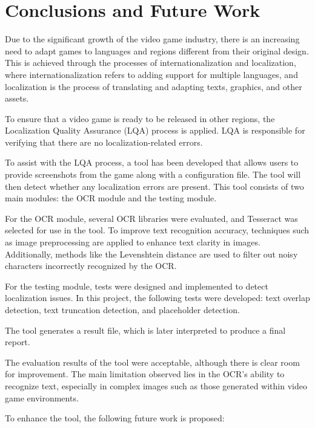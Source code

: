 \chapter*{Conclusions and Future Work}
\label{cap:conclusions}

Due to the significant growth of the video game industry, there is an increasing need to adapt games to languages and regions different from their original design. This is achieved through the processes of internationalization and localization, where internationalization refers to adding support for multiple languages, and localization is the process of translating and adapting texts, graphics, and other assets.

To ensure that a video game is ready to be released in other regions, the Localization Quality Assurance (LQA) process is applied. LQA is responsible for verifying that there are no localization-related errors.

To assist with the LQA process, a tool has been developed that allows users to provide screenshots from the game along with a configuration file. The tool will then detect whether any localization errors are present. This tool consists of two main modules: the OCR module and the testing module.

For the OCR module, several OCR libraries were evaluated, and Tesseract was selected for use in the tool. To improve text recognition accuracy, techniques such as image preprocessing are applied to enhance text clarity in images. Additionally, methods like the Levenshtein distance are used to filter out noisy characters incorrectly recognized by the OCR.

For the testing module, tests were designed and implemented to detect localization issues. In this project, the following tests were developed: text overlap detection, text truncation detection, and placeholder detection.

The tool generates a result file, which is later interpreted to produce a final report.

The evaluation results of the tool were acceptable, although there is clear room for improvement. The main limitation observed lies in the OCR’s ability to recognize text, especially in complex images such as those generated within video game environments.

To enhance the tool, the following future work is proposed:

